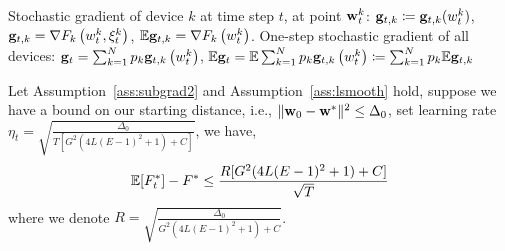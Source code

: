 
Stochastic gradient of device $k$ at time step $t$, at point ${\mathbf{w}}_t^k$: 
	${\mathbf{g}}_{t,k} \coloneqq {\mathbf{g}}_{t,k}(w_t^k)$,
	$ {\mathbf{g}}_{t, k} = {\nabla} F_{k}\left(w_{t}^{k}, \xi_{t}^{k}\right) $,
	$\mathbb{E} {\mathbf{g}}_{t, k} = {\nabla} F_{k}\left(w_{t}^{k}\right)$.
One-step stochastic gradient of all devices:
${\mathbf{g}}_{t}=\sum_{k=1}^{N} p_{k} {\mathbf{g}}_{t, k}\left(w_{t}^{k}\right) $, $\mathbb{E} {\mathbf{g}}_{t}= \mathbb{E} \sum_{k=1}^{N} p_{k} {\mathbf{g}}_{t, k}\left(w_{t}^{k}\right) \coloneqq \sum_{k=1}^{N} p_{k} \mathbb{E} {\mathbf{g}}_{t, k}$

\begin{theorem}
Let Assumption~\ref{ass:subgrad2} and Assumption~\ref{ass:lsmooth} hold, suppose we have a bound 
on our starting distance, i.e., $\|{\mathbf{w}}_{0} - {\mathbf{w}}^*\|^2 \leq \Delta_0$, set learning rate $\eta_t = \sqrt{ \frac{\Delta_0}{ T [G^2( 4L(E-1)^2 + 1) + C] }}$, we have,
$$\mathbb{E}[ F_t^*] - F^*  \leq \frac{R [G^2( 4L(E-1)^2 + 1) + C] }{\sqrt{T}}$$
where we denote $R = \sqrt{ \frac{\Delta_0}{ G^2( 4L(E-1)^2 + 1) + C }}$.
\end{theorem}

